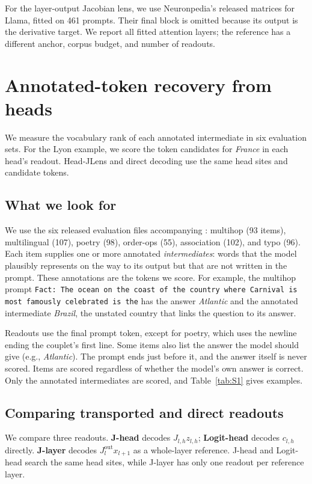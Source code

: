 \documentclass[11pt,a4paper]{article}
\newcommand{\code}[1]{\texttt{#1}}       %
\begin{document}
For the layer-output Jacobian lens, we use Neuronpedia's released matrices for Llama, fitted on 461 prompts. Their final block is omitted because its output is the derivative target. We report all fitted attention layers; the reference has a different anchor, corpus budget, and number of readouts.

\section{Annotated-token recovery from heads}\label{sec:3}

We measure the vocabulary rank of each annotated intermediate in six evaluation sets. For the Lyon example, we score the token candidates for \emph{France} in each head's readout. Head-JLens and direct decoding use the same head sites and candidate tokens.

\subsection{What we look for}\label{sec:3.1}

We use the six released evaluation files accompanying \citet{gurnee2026}: multihop (93 items), multilingual (107), poetry (98), order-ops (55), association (102), and typo (96). Each item supplies one or more annotated \emph{intermediates}: words that the model plausibly represents on the way to its output but that are not written in the prompt. These annotations are the tokens we score. For example, the multihop prompt \code{Fact: The ocean on the coast of the country where Carnival is most famously celebrated is the} has the answer \emph{Atlantic} and the annotated intermediate \emph{Brazil}, the unstated country that links the question to its answer.

Readouts use the final prompt token, except for poetry, which uses the newline ending the couplet's first line. Some items also list the answer the model should give (e.g., \emph{Atlantic}). The prompt ends just before it, and the answer itself is never scored. Items are scored regardless of whether the model's own answer is correct. Only the annotated intermediates are scored, and Table~\ref{tab:S1} gives examples.

\subsection{Comparing transported and direct readouts}\label{sec:3.2}

We compare three readouts. \textbf{J-head} decodes $J_{l,h}z_{l,h}$; \textbf{Logit-head} decodes $c_{l,h}$ directly. \textbf{J-layer} decodes $J_l^{\mathrm{out}}x_{l+1}$ as a whole-layer reference. J-head and Logit-head search the same head sites, while J-layer has only one readout per reference layer.
\end{document}
